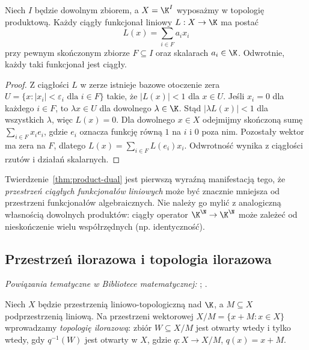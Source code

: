 \begin{twierdzenie}\label{thm:product-dual}
Niech $I$ będzie dowolnym zbiorem, a $X=\K^I$ wyposażmy
w topologię produktową. Każdy ciągły funkcjonał liniowy
$L:X\to\K$ ma postać
\[
 L(x)=\sum_{i\in F}a_i x_i
\]
przy pewnym skończonym zbiorze $F\subseteq I$ oraz
skalarach $a_i\in\K$. Odwrotnie, każdy taki funkcjonał
jest ciągły.
\end{twierdzenie}
\begin{proof}
Z ciągłości $L$ w zerze istnieje bazowe otoczenie zera
$U=\{x:|x_i|<\varepsilon_i\text{ dla }i\in F\}$
takie, że $|L(x)|<1$ dla $x\in U$.
Jeśli $x_i=0$ dla każdego $i\in F$, to $\lambda x\in U$
dla dowolnego $\lambda\in\K$. Stąd
$|\lambda L(x)|<1$ dla wszystkich $\lambda$, więc $L(x)=0$.
Dla dowolnego $x\in X$ odejmijmy skończoną sumę
$\sum_{i\in F}x_i e_i$, gdzie $e_i$ oznacza funkcję
równą $1$ na $i$ i $0$ poza nim. Pozostały wektor
ma zera na $F$, dlatego $L(x)=\sum_{i\in F}L(e_i)x_i$.
Odwrotność wynika z ciągłości rzutów i działań skalarnych.
\end{proof}

\begin{uwaga}
Twierdzenie~\ref{thm:product-dual} jest pierwszą wyraźną
manifestacją tego, że \emph{przestrzeń ciągłych funkcjonałów liniowych}
może być znacznie mniejsza od przestrzeni funkcjonałów algebraicznych. Nie należy go
mylić z analogiczną własnością dowolnych produktów:
ciągły operator $\K^{\N}\to\K^{\N}$ może zależeć
od nieskończenie wielu współrzędnych (np. identyczność).
\end{uwaga}

\subsection{Przestrzeń ilorazowa i topologia ilorazowa}

\noindent\emph{Powiązania tematyczne w Bibliotece matematycznej:} ; .


\begin{definicja}
Niech $X$ będzie przestrzenią liniowo-topologiczną nad $\K$,
a $M\subseteq X$ podprzestrzenią liniową. Na przestrzeni
wektorowej $X/M=\{x+M:x\in X\}$ wprowadzamy
\emph{topologię ilorazową}: zbiór $W\subseteq X/M$
jest otwarty wtedy i tylko wtedy, gdy $q^{-1}(W)$
jest otwarty w $X$, gdzie $q:X\to X/M$, $q(x)=x+M$.
\end{definicja}

